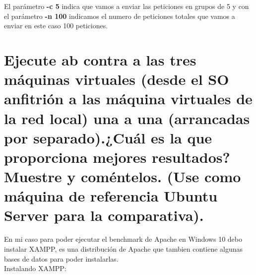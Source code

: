 El parámetro \textbf{-c 5} indica que vamos a enviar las peticiones en grupos de 5 y con el parámetro \textbf{-n 100} indicamos el numero de peticiones totales que vamos a enviar en este caso 100 peticiones.



\section[Cuestión 3]{Ejecute ab contra a las tres máquinas virtuales (desde el SO	anfitrión a las máquina virtuales de la red local) una a una (arrancadas por	separado).¿Cuál es la que proporciona mejores resultados? Muestre y coméntelos. (Use como máquina de referencia Ubuntu Server para la comparativa).}

En mi caso para poder ejecutar el benchmark de Apache en Windows 10 debo instalar XAMPP, es una distribución de Apache que tambien contiene algunas bases de datos para poder instalarlas.\\

Instalando XAMPP:

